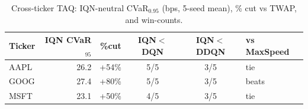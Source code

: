 \begin{table}[H]\centering
\caption{Cross-ticker TAQ: IQN-neutral CVaR$_{0.95}$ (bps, 5-seed mean), \% cut vs TWAP, and win-counts.}
\label{tab:v2_taq_cross}
\begin{tabular}{@{}lrrccl@{}}
\toprule
Ticker & IQN CVaR$_{95}$ & \%cut & IQN$<$DQN & IQN$<$DDQN & vs MaxSpeed \\
\midrule
AAPL & 26.2 & +54\% & 5/5 & 3/5 & tie \\
GOOG & 27.4 & +80\% & 5/5 & 3/5 & beats \\
MSFT & 23.1 & +50\% & 4/5 & 3/5 & tie \\
\bottomrule
\end{tabular}
\end{table}
